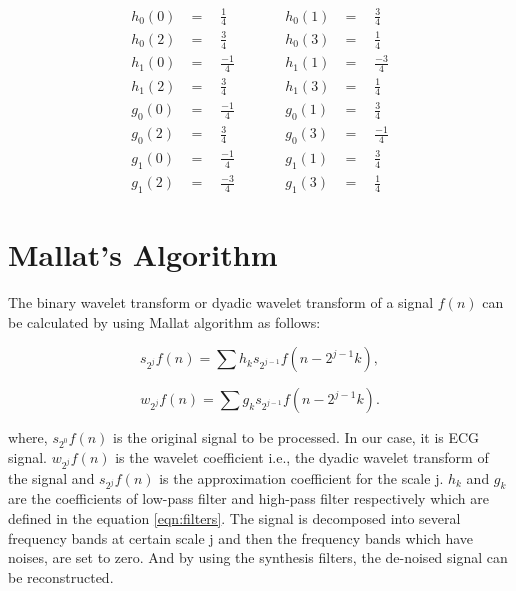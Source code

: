 \begin{equation}
\label{eqn:filters}
\begin{aligned}
		h_0(0) & =  \quad \frac{1}{4}    & \quad &\quad  h_0(1) &= \quad \frac{3}{4} \\
		h_0(2) & =  \quad \frac{3}{4}    & \quad &\quad   h_0(3) &= \quad \frac{1}{4} \\[1ex]
		h_1(0) & =  \quad \frac{- 1}{4}  & \quad &\quad   h_1(1) &= \quad \frac{-3}{4} \\
		h_1(2) & =  \quad \frac{3}{4}    & \quad &\quad   h_1(3) &= \quad \frac{1}{4} \\[1ex]
		g_0(0) & =  \quad \frac{-1}{4}   & \quad &\quad   g_0(1) &= \quad \frac{3}{4} \\
		g_0(2) & =  \quad \frac{3}{4}    & \quad &\quad   g_0(3) &= \quad \frac{-1}{4} \\[1ex]
		g_1(0) & =  \quad \frac{-1}{4}   & \quad &\quad   g_1(1) &= \quad \frac{3}{4} \\
		g_1(2) & =  \quad \frac{-3}{4}   & \quad &\quad   g_1(3) &= \quad \frac{1}{4}
\end{aligned}
\end{equation}




\section{Mallat's Algorithm}
The binary wavelet transform or dyadic wavelet transform of a signal $f(n)$ can be calculated by using Mallat algorithm \cite{119727} as follows:

\begin{equation} 
{ s_{2^j}f(n) = \sum h_ks_{2^{j-1}}f(n - 2^{j-1}k),   }
\end{equation}

\begin{equation} 
{ w_{2^j}f(n) = \sum g_ks_{2^{j-1}}f(n - 2^{j-1}k).   }
\end{equation}

where, $s_{2^0}f(n)$ is the original signal to be processed. In our case, it is ECG signal. $w_{2^j}f(n)$ is the wavelet coefficient i.e., the dyadic wavelet transform of the signal and $s_{2^j}f(n)$ is the approximation coefficient for the scale j. $h_k$ and $g_k$ are the coefficients of low-pass filter and high-pass filter respectively which are defined in the equation \ref{eqn:filters}. The signal is decomposed into several frequency bands at certain scale j and then the frequency bands which have noises, are set to zero. And by using the synthesis filters, the de-noised signal can be reconstructed.




